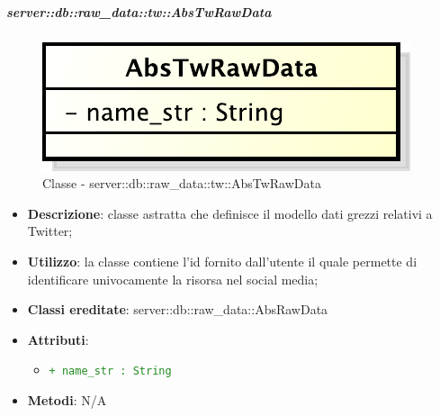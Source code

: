 		\subparagraph{server::db::raw\_data::tw::AbsTwRawData} %
		\label{subp:server_db_raw_data_tw_abstwrawdata}
			\begin{figure}[htbp]
				\centering
				\centerline{\includegraphics[scale=0.75]{./images/server/classes/db/abs_tw_raw_data.pdf}}
				\caption{Classe - server::db::raw\_data::tw::AbsTwRawData}
			\end{figure}
			\begin{itemize}
				\item \textbf{Descrizione}: classe astratta che definisce il modello dati grezzi relativi a Twitter;
				\item \textbf{Utilizzo}: la classe contiene l'id fornito dall'utente il quale permette di identificare univocamente la risorsa nel social media;
				\item \textbf{Classi ereditate}: server::db::raw\_data::AbsRawData
				\item \textbf{Attributi}:
					\begin{itemize}
						\item \textcolor{forestgreen}{\texttt{+ name\_str : String}}
					\end{itemize}
				\item \textbf{Metodi}: N/A
			\end{itemize}


